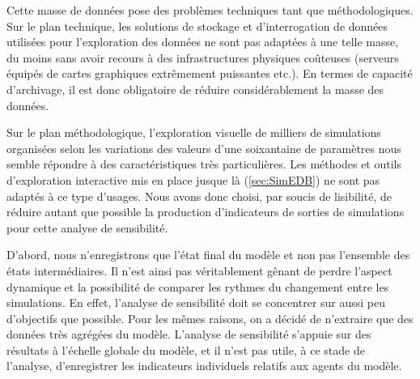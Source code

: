 Cette masse de données pose des problèmes techniques tant que méthodologiques.
Sur le plan technique, les solutions de stockage et d'interrogation de données utilisées pour l'exploration des données ne sont pas adaptées à une telle masse, du moins sans avoir recours à des infrastructures physiques coûteuses (serveurs équipés de cartes graphiques extrêmement puissantes etc.).
En termes de capacité d'archivage, il est donc obligatoire de réduire considérablement la masse des données.

Sur le plan méthodologique, l'exploration visuelle de milliers de simulations organisées selon les variations des valeurs d'une soixantaine de paramètres nous semble répondre à des caractéristiques très particulières.
Les méthodes et outils d'exploration interactive mis en place jusque là (\cref{sec:SimEDB}) ne sont pas adaptés à ce type d'usages.
Nous avons donc choisi, par soucis de lisibilité, de réduire autant que possible la production d'indicateurs de sorties de simulations pour cette analyse de sensibilité.

D'abord, nous n'enregistrons que l'état final du modèle et non pas l'ensemble des états intermédiaires.
Il n'est ainsi pas véritablement gênant de perdre l'aspect dynamique et la possibilité de comparer les rythmes du changement entre les simulations.
En effet, l'analyse de sensibilité doit se concentrer sur aussi peu d'objectifs que possible.
Pour les mêmes raisons, on a décidé de n'extraire que des données très agrégées du modèle.
L'analyse de sensibilité s'appuie sur des résultats à l'échelle globale du modèle, et il n'est pas utile, à ce stade de l'analyse, d'enregistrer les indicateurs individuels relatifs aux agents du modèle.

